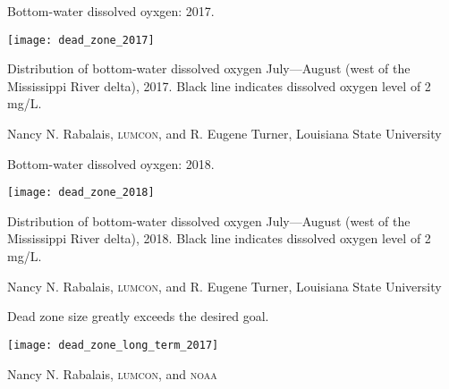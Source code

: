 \documentclass[t]{beamer}
\begin{document}
\begin{frame}{Bottom-water dissolved oyxgen: 2017.}

\texttt{[image: dead\_zone\_2017]}

Distribution of bottom-water dissolved oxygen July—August (west of the Mississippi River delta), 2017. Black line indicates dissolved oxygen level of 2 mg/L.

\vfilll

\hfill \tiny Nancy N. Rabalais, \textsc{lumcon}, and R. Eugene Turner, Louisiana State University

\end{frame}
%
\begin{frame}{Bottom-water dissolved oyxgen: 2018.}

\texttt{[image: dead\_zone\_2018]}

Distribution of bottom-water dissolved oxygen July—August (west of the Mississippi River delta), 2018. Black line indicates dissolved oxygen level of 2 mg/L.

\vfilll

\hfill \tiny Nancy N. Rabalais, \textsc{lumcon}, and R. Eugene Turner, Louisiana State University

\end{frame}
%
\begin{frame}{Dead zone size greatly exceeds the desired goal.}

	{\centering \texttt{[image: dead\_zone\_long\_term\_2017]}\par
	}

	\vfilll
	
	\hfill \tiny Nancy N. Rabalais, \textsc{lumcon}, and \textsc{noaa} %

\end{frame}
%
\end{document}
